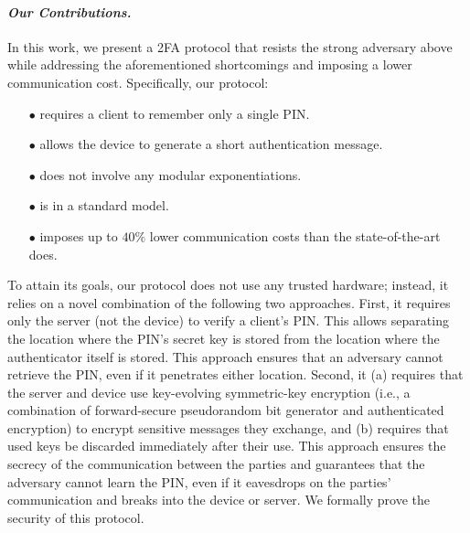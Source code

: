 \vspace{-4mm}
\paragraph{\textbf{\textit{Our Contributions.}}}  In this work, we present a 2FA protocol that resists the strong adversary above while addressing the aforementioned shortcomings and imposing a lower communication cost. Specifically, our protocol:

\vspace{-2mm}
\begin{itemize}
\item[$\bullet$] requires a client to remember only a single PIN.

\item[$\bullet$] {allows the device to generate a short authentication message.} 

\item[$\bullet$] does not involve any modular exponentiations.

\item[$\bullet$] is in a standard model.

\item[$\bullet$]  imposes up to $40\%$ lower communication costs than the state-of-the-art does. 


\end{itemize}

\vspace{-2mm}

 To attain its goals, our protocol does not use any trusted hardware; instead, it relies on a novel combination of the following two approaches. First, it requires only the server  (not the device) to verify a client’s PIN. This allows separating the location where the PIN’s secret key is stored from the location where the authenticator itself is stored. This approach ensures that an adversary cannot retrieve the PIN, even if it penetrates either location.  Second, it  (a) requires that the server and device use key-evolving symmetric-key encryption (i.e., a combination of forward-secure pseudorandom bit generator and authenticated encryption) to encrypt sensitive messages they exchange,  and (b) requires that used keys be discarded immediately after their use. This approach ensures the secrecy of the communication between the parties and guarantees that the adversary cannot learn the PIN, even if it eavesdrops on the parties' communication and breaks into the device or server. We formally prove the security of this protocol. 


